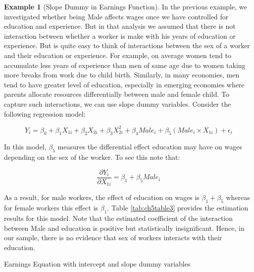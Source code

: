 \documentclass[
]{book}
\theoremstyle{definition}
\theoremstyle{definition}
\newtheorem{example}{Example}[chapter]
\theoremstyle{definition}
\theoremstyle{definition}
\theoremstyle{remark}
\begin{document}
\begin{example}[Slope Dummy in Earnings Function]
\protect\hypertarget{exm:unnamed-chunk-30}{}\label{exm:unnamed-chunk-30}In the previous example, we investigated whether being Male affects wages once we have controlled for education and experience. But in that analysis we assumed that there is not interaction between whether a worker is make with his years of education or experience. But is quite easy to think of interactions between the sex of a worker and their education or experience. For example, on average women tend to accumulate less years of experience than men of same age due to women taking more breaks from work due to child birth. Similarly, in many economies, men tend to have greater level of education, especially in emerging economies where parents allocate resources differentially between male and female child. To capture such interactions, we can use slope dummy variables. Consider the following regression model:

\[Y_i= \beta_0 + \beta_1 X_{1i} + \beta_2 X_{2i} + \beta_3 X_{2i}^2 + \beta_4 Male_i+ \beta_5 (Male_i \times X_{1i}) +\epsilon_i\]

In this model, \(\beta_5\) measures the differential effect education may have on wages depending on the sex of the worker. To see this note that:

\[\frac{\partial Y_i}{\partial X_{1i}}= \beta_1 + \beta_5 Male_i\]

As a result, for male workers, the effect of education on wages is \(\beta_1 + \beta_5\) whereas for female workers this effect is \(\beta_1\). Table \ref{tab:ch5table3} provides the estimation results for this model. Note that the estimated coefficient of the interaction between Male and education is positive but statistically insignificant. Hence, in our sample, there is no evidence that sex of workers interacts with their education.
\end{example}

\label{tab:ch5table3} Earnings Equation with intercept and slope dummy variables
\end{document}
